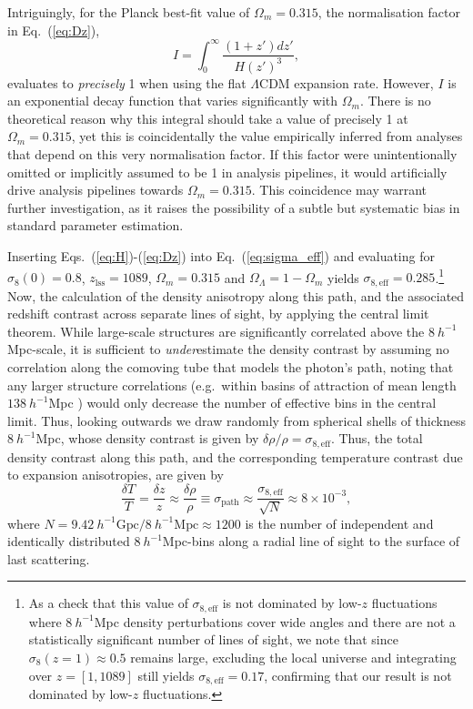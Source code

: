 \documentclass[aps,prd,reprint,superscriptaddress]{revtex4-2}
\begin{document}
Intriguingly, for the Planck best-fit value of \( \Omega_m = 0.315 \), the normalisation factor in Eq.~(\ref{eq:Dz}),  
\begin{equation}
    I = \int_0^{\infty} \frac{(1+z')dz'}{H(z')^3},
\end{equation}
evaluates to \textit{precisely} 1 when using the flat $\Lambda$CDM expansion rate. However, $I$ is an exponential decay function that varies significantly with $\Omega_m$. There is no theoretical reason why this integral should take a value of precisely 1 at $\Omega_m=0.315$, yet this is coincidentally the value empirically inferred from analyses that depend on this very normalisation factor. If this factor were unintentionally omitted or implicitly assumed to be 1 in analysis pipelines, it would artificially drive analysis pipelines towards $\Omega_m=0.315$. This coincidence may warrant further investigation, as it raises the possibility of a subtle but systematic bias in standard parameter estimation.

Inserting Eqs.~(\ref{eq:H})-(\ref{eq:Dz}) into Eq.~(\ref{eq:sigma_eff}) and evaluating for $\sigma_8(0)=0.8$, $z_{\mathrm{lss}}=1089$, $\Omega_m=0.315$ and $\Omega_{\Lambda}=1-\Omega_m$ yields $\sigma_{8,\mathrm{eff}}=0.285$.\footnote{As a check that this value of $\sigma_{8,\mathrm{eff}}$ is not dominated by low-$z$ fluctuations where $8~h^{-1}$Mpc density perturbations cover wide angles and there are not a statistically significant number of lines of sight, we note that since $\sigma_8(z=1)\approx0.5$ remains large, excluding the local universe and integrating over $z=[1,1089]$ still yields $\sigma_{8,\mathrm{eff}}=0.17$, confirming that our result is not dominated by low-$z$ fluctuations.} Now, the calculation of the density anisotropy along this path, and the associated redshift contrast across separate lines of sight, by applying the central limit theorem. While large-scale structures are significantly correlated above the $8~h^{-1}$Mpc-scale, it is sufficient to \textit{under}estimate the density contrast by assuming no correlation along the comoving tube that models the photon's path, noting that any larger structure correlations (e.g.\ within basins of attraction of mean length $138~h^{-1}$Mpc \cite{Valade2024}) would only decrease the number of effective bins in the central limit. Thus, looking outwards we draw randomly from spherical shells of thickness $8~h^{-1}$Mpc, whose density contrast is given by $\delta\rho/\rho=\sigma_{8,\mathrm{eff}}$. Thus, the total density contrast along this path, and the corresponding temperature contrast due to expansion anisotropies, are given by
\begin{equation}
    \frac{\delta T}{T}=\frac{\delta z}{z}\approx\frac{\delta\rho}{\rho}\equiv\sigma_{\mathrm{path}}\approx\frac{\sigma_{8,\mathrm{eff}}}{\sqrt{N}}\approx 8\times10^{-3},\label{eq:dz}
\end{equation}
where $N=9.42~h^{-1}\mathrm{Gpc}/8~h^{-1}\mathrm{Mpc}\approx1200$ is the number of independent and identically distributed $8~h^{-1}$Mpc-bins along a radial line of sight to the surface of last scattering.
\end{document}
